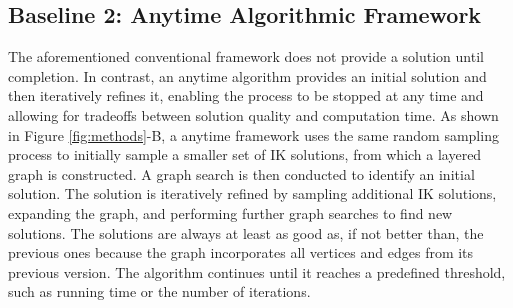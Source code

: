 \iffalse
\begin{algorithm}
    \caption{Conventional algorithmic framework}
    \label{alg:existing}
    \SetKwProg{Fn}{Function}{}{}
    \SetKwProg{For}{for}{\ do}{}
    \SetKwProg{If}{if}{\ then}{}
    \SetKwInOut{Input}{input}
    \SetKwInOut{Output}{output}
    \SetKwInOut{Hyper}{hparam}
    \SetKw{KwTo}{to}
    \SetKw{KwOr}{or}
    \SetKw{KwAnd}{and}
    \SetKwFunction{SEARCH}{SEARCH}%
    \SetKwFunction{SAMPLING}{SAMPLING}%
    \SetKwFunction{CDG}{ADD\_DENSE\_GRAPH}%

    \Input{an end-effector trajectory $\xi = \{(t_0, \mathbf{p}_0), (t_1, \mathbf{p}_1), ..., (t_{n-1}, \mathbf{p}_{n-1})\}$}
    \Output{a joint space trajectory $p$}
    \Hyper{number of IK solutions for each waypoint $m$}
    \Comment*[l]{IK Sampling}
    $V \leftarrow \SAMPLING(\xi, step=1, m)$ \\
    \Comment*[l]{Graph Construction}
    $E \leftarrow \CDG(V)$ \\
    $G \leftarrow (V, E)$ \\
    \Comment*[l]{Graph Search}
    $p =$ \SEARCH(G)
\end{algorithm}
\fi


\vspace{-3mm}
\subsection{Baseline 2: \Naive Anytime Algorithmic Framework} \label{sec:naive}
The aforementioned conventional framework does not provide a solution until completion. 
In contrast, an anytime algorithm provides an initial solution and then iteratively refines it, enabling the process to be stopped at any time and allowing for tradeoffs between solution quality and computation time. 
As shown in Figure \ref{fig:methods}-B,  a \naive anytime framework uses the same random sampling process to initially sample a smaller set of IK solutions, from which a layered graph is constructed. A graph search is then conducted to identify an initial solution.
The solution is iteratively refined by sampling additional IK solutions, expanding the graph, and performing further graph searches to find new solutions. 
The solutions are always at least as good as, if not better than, the previous ones because the graph incorporates all vertices and edges from its previous version. The algorithm continues until it reaches a predefined threshold, such as running time or the number of iterations.


